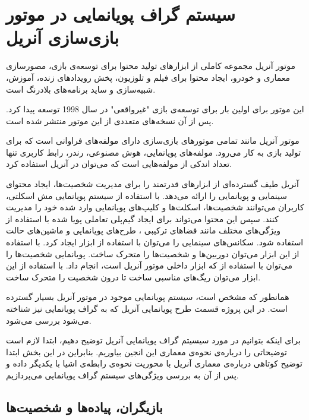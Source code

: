 \chapter {سیستم گراف پویانمایی در موتور بازی‌سازی آنریل}

موتور آنریل مجموعه کاملی از ابزار‌های تولید محتوا برای توسعه‌ی بازی، مصورسازی معماری و خودرو، 
ایجاد محتوا برای فیلم و تلوزیون،
پخش رویداد‌های زنده، آموزش، شبیه‌سازی 
و ساید برنامه‌های بلادرنگ است.

این موتور برای اولین بار برای توسعه‌ی بازی "غیرواقعی" در سال 1998 توسعه پیدا کرد.
پس از آن نسخه‌های متعددی از این موتور منتشر شده است.
\cite{UnrealEngineWikiPedia}

موتور آنریل مانند تمامی موتور‌های بازی‌سازی دارای مولفه‌های فراوانی است که برای 
تولید بازی به کار می‌رود.
مولفه‌های پویانمایی، هوش مصنوعی، رندر، رابط کاربری تنها تعداد اندکی از مولفه‌هایی است که ‌می‌توان در 
آنریل استفاده کرد.

آنریل طیف گسترده‌ای از ابزار‌های قدرتمند را برای مدیریت شخصیت‌ها، ایجاد محتوای سینمایی 
و پویانمایی را ارائه می‌دهد.
با استفاده از سیستم پویانمایی مش اسکلتی، 
کاربران می‌توانند شخصیت‌ها، اسکلت‌ها و کلیپ‌های پویانمایی 
وارد شده خود را مدیریت کنند.
سپس این محتوا می‌تواند برای ایجاد گیم‌پلی تعاملی پویا شده با استفاده از 
ویژگی‌های مختلف مانند 
فضا‌های ترکیبی 
، طرح‌های پویانمایی 
و ماشین‌های حالت 
استفاده شود.
سکانس‌های سینمایی را می‌توان با استفاده از ابزار 
ایجاد کرد. با استفاده از این ابزار می‌توان 
دوربین‌ها و شخصیت‌ها را متحرک ساخت.
پویانمایی شخصیت‌ها را می‌توان با استفاده از 
که ابزار داخلی 
موتور آنریل است، انجام داد.
با استفاده از این ابزار می‌توان ریگ‌های مناسبی ساخت تا 
درون 
شخصیت را متحرک ساخت.
\cite{UnrealEngineAnimation}

همانطور که مشخص است، سیستم پویانمایی موجود در موتور آنریل بسیار گسترده است. در این پروژه 
قسمت طرح پویانمایی آنریل که به گراف پویانمایی نیز شناخته می‌شود بررسی می‌شود.

برای اینکه بتوانیم در مورد سیسیتم گراف پویانمایی آنریل توضیح دهیم، ابتدا لازم است 
توضیحاتی را درباره‌ی نحوه‌ی معماری این انجین بیاوریم. بنابراین در این بخش ابتدا توضیح کوتاهی 
درباره‌ی معماری آنریل با محوریت نحوه‌ی رابطه‌‌ی اشیا با یکدیگر داده و 
پس از آن به بررسی ویژگی‌های سیستم گراف پویانمایی می‌پردازیم.

 
\section{بازیگران، پیاده‌ها و شخصیت‌‌ها}


